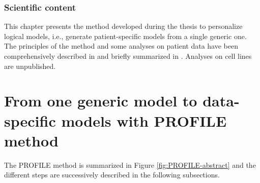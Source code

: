 \documentclass[a4paper,12pt,twoside,onecolumn,openright,final,oldfontcommands]{memoir}
\begin{document}
\subsubsection*{Scientific content}\label{scientific-content-2}

This chapter presents the method developed during the thesis to
personalize logical models, i.e., generate patient-specific models from
a single generic one. The principles of the method and some analyses on
patient data have been comprehensively described in
\citet{beal2019personalization} and briefly summarized in
\citet{beal2020personalized}. Analyses on cell lines are unpublished.

\section{From one generic model to data-specific models with PROFILE
method}\label{from-one-generic-model-to-data-specific-models-with-profile-method}

The PROFILE method is summarized in Figure \ref{fig:PROFILE-abstract}
and the different steps are successively described in the following
subsections.
\end{document}
